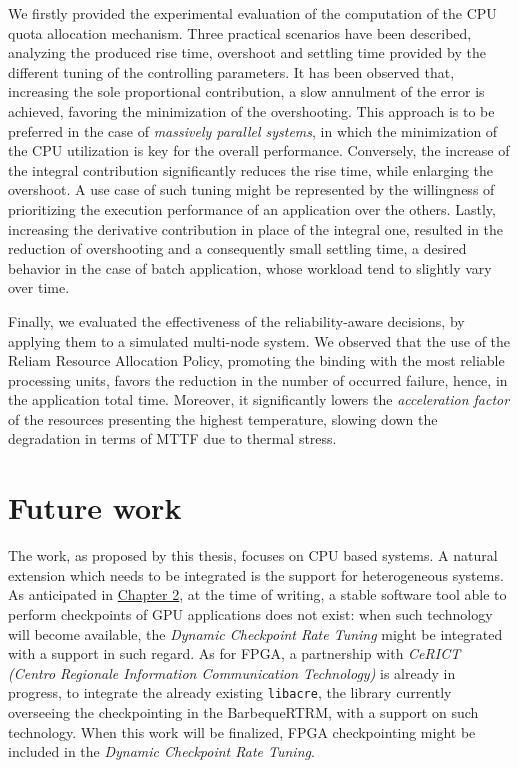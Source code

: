 We firstly provided the experimental evaluation of the computation of the CPU quota allocation mechanism. Three practical scenarios have been described, analyzing the produced rise time, overshoot and settling time provided by the different tuning of the controlling parameters. It has been observed that, increasing the sole proportional contribution, a slow annulment of the error is achieved, favoring the minimization of the overshooting. This approach is to be preferred in the case of \emph{massively parallel systems}, in which the minimization of the CPU utilization is key for the overall performance. Conversely, the increase of the integral contribution significantly reduces the rise time, while enlarging the overshoot. A use case of such tuning might be represented by the willingness of prioritizing the execution performance of an application over the others. Lastly, increasing the derivative contribution in place of the integral one, resulted in the reduction of overshooting and a consequently small settling time, a desired behavior in the case of batch application, whose workload tend to slightly vary over time.

Finally, we evaluated the effectiveness of the reliability-aware decisions, by applying them to a simulated multi-node system. We observed that the use of the Reliam Resource Allocation Policy, promoting the binding with the most reliable processing units, favors the reduction in the number of occurred failure, hence, in the application total time. Moreover, it significantly lowers the \emph{acceleration factor} of the resources presenting the highest temperature, slowing down the degradation in terms of MTTF due to thermal stress.

\section{Future work}
The work, as proposed by this thesis, focuses on CPU based systems. A natural extension which needs to be integrated is the support for heterogeneous systems. As anticipated in {\hyperref[cap:stateofart]{Chapter 2}}, at the time of writing, a stable software tool able to perform checkpoints of GPU applications does not exist: when such technology will become available, the \emph{Dynamic Checkpoint Rate Tuning} might be integrated with a support in such regard. As for FPGA, a partnership with \emph{CeRICT (Centro Regionale Information Communication Technology)} is already in progress, to integrate the already existing \verb|libacre|, the library currently overseeing the checkpointing in the BarbequeRTRM, with a support on such technology. When this work will be finalized, FPGA checkpointing might be included in the \emph{Dynamic Checkpoint Rate Tuning}.

